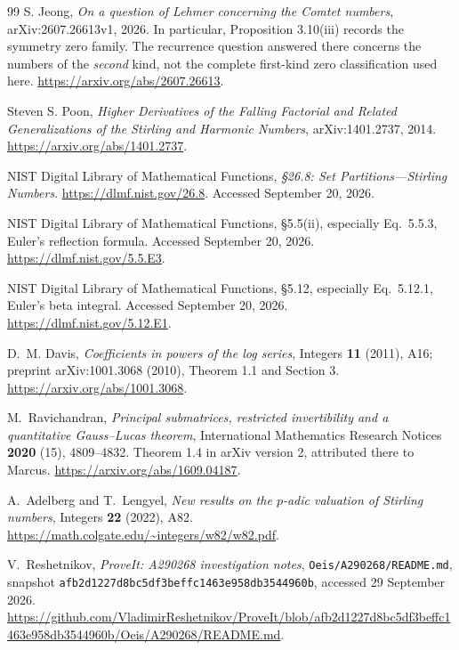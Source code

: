\documentclass[11pt,a4paper]{article}
\numberwithin{equation}{section}
\theoremstyle{definition}
\theoremstyle{remark}
\theoremstyle{plain}
\begin{document}
\begin{thebibliography}{99}
S. Jeong,
\emph{On a question of Lehmer concerning the Comtet numbers},
arXiv:2607.26613v1, 2026.
In particular, Proposition 3.10(iii) records the symmetry zero family.
The recurrence question answered there concerns the numbers of the
\emph{second} kind, not the complete first-kind zero classification used here.
\url{https://arxiv.org/abs/2607.26613}.

Steven S. Poon,
\emph{Higher Derivatives of the Falling Factorial and Related
Generalizations of the Stirling and Harmonic Numbers},
arXiv:1401.2737, 2014.
\url{https://arxiv.org/abs/1401.2737}.

NIST Digital Library of Mathematical Functions,
\emph{\S26.8: Set Partitions---Stirling Numbers}.
\url{https://dlmf.nist.gov/26.8}.
Accessed September 20, 2026.

NIST Digital Library of Mathematical Functions,
\S5.5(ii), especially Eq.~5.5.3, Euler's reflection formula.
Accessed September 20, 2026.
\url{https://dlmf.nist.gov/5.5.E3}.

NIST Digital Library of Mathematical Functions,
\S5.12, especially Eq.~5.12.1, Euler's beta integral.
Accessed September 20, 2026.
\url{https://dlmf.nist.gov/5.12.E1}.

D.~M. Davis,
\emph{Coefficients in powers of the log series},
Integers \textbf{11} (2011), A16; preprint arXiv:1001.3068 (2010),
Theorem 1.1 and Section 3.
\url{https://arxiv.org/abs/1001.3068}.

M.~Ravichandran,
\emph{Principal submatrices, restricted invertibility and a quantitative
Gauss--Lucas theorem},
International Mathematics Research Notices \textbf{2020} (15), 4809--4832.
Theorem 1.4 in arXiv version 2, attributed there to Marcus.
\url{https://arxiv.org/abs/1609.04187}.

A.~Adelberg and T.~Lengyel,
\emph{New results on the $p$-adic valuation of Stirling numbers},
Integers \textbf{22} (2022), A82.
\url{https://math.colgate.edu/~integers/w82/w82.pdf}.

V.~Reshetnikov, \emph{ProveIt: A290268 investigation notes},
\texttt{Oeis/A290268/README.md}, snapshot
\texttt{afb2d1227d8bc5df3beffc1463e958db3544960b}, accessed 29 September 2026.
\url{https://github.com/VladimirReshetnikov/ProveIt/blob/afb2d1227d8bc5df3beffc1463e958db3544960b/Oeis/A290268/README.md}.


\end{thebibliography}
\end{document}
